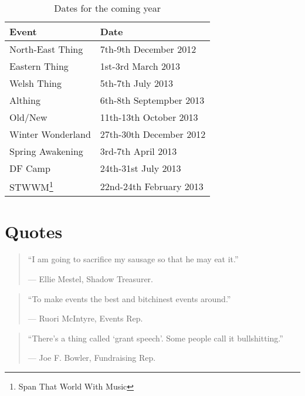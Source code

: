 \documentclass[a4paper, 12pt]{article}
\begin{document}
\begin{savenotes}
\begin{table}[H]
\centering

\begin{tabular}{ l | l}
\textbf{Event}		& \textbf{Date} \\ \hline
North-East Thing	& 7th-9th December 2012 \\
Eastern Thing		& 1st-3rd March 2013 \\
Welsh Thing			& 5th-7th July 2013 \\
Althing				& 6th-8th Septempber 2013 \\
Old/New				& 11th-13th October 2013 \\ \hline
Winter Wonderland	& 27th-30th December 2012 \\
Spring Awakening	& 3rd-7th April 2013 \\
DF Camp				& 24th-31st July 2013 \\
STWWM\footnote{Span That World With Music}	& 22nd-24th February 2013 \\
\end{tabular}
\caption{Dates for the coming year}
\end{table}
\end{savenotes}

\section{Quotes}
\begin{quote}
``I am going to sacrifice my sausage so that he may eat it.''

--- Ellie Mestel, Shadow Treasurer.
\end{quote}

\begin{quote}
``To make events the best and bitchinest events around.''

--- Ruori McIntyre, Events Rep.
\end{quote}

\begin{quote}
``There's a thing called `grant speech'. Some people call it bullshitting.''

--- Joe F. Bowler, Fundraising Rep.
\end{quote}
\end{document}
